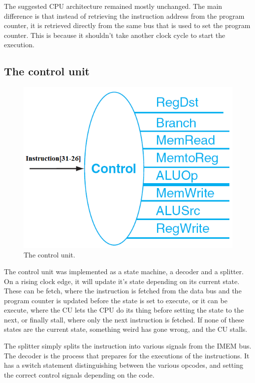 The suggested CPU architecture remained mostly unchanged.
The main difference is that instead of retrieving the instruction address from the program counter, %
it is retrieved directly from the same bus that is used to set the program
counter. This is because it shouldn't take another clock cycle to start the
execution.

\subsection{The control unit}
\begin{figure}[ht]
    \centering
    \includegraphics[scale=0.3]{figures/controlunit.png}
    \caption{\label{fig:controlUnit}The control unit.}
\end{figure}
The control unit was implemented as a state machine, a decoder and a splitter.
On a rising clock edge, it will update it's state depending on its current
state. These can be fetch, where the instruction is fetched from the data bus
and the program counter is updated before the state is set to execute, or it can
be execute, where the CU lets the CPU do its thing before setting the state to
the next, or finally stall, where only the next instruction is fetched. If none
of these states are the current state, something weird has gone wrong, and the
CU stalls.

The splitter simply splits the instruction into various signals from the IMEM
bus. The decoder is the process that prepares for the executions of the
instructions. It has a switch statement distinguishing between the various
opcodes, and setting the correct control signals depending on the code. 
